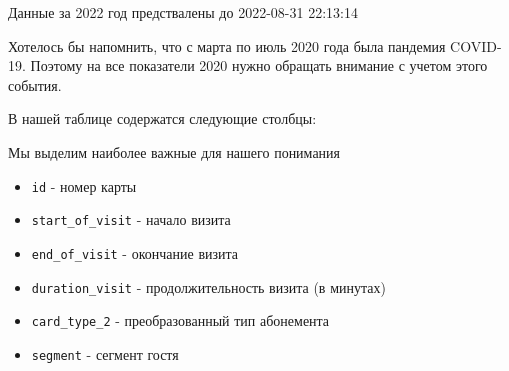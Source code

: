 \documentclass[
  letterpaper,
  DIV=11,
  numbers=noendperiod]{scrreprt}
\begin{document}
\begin{tcolorbox}[enhanced jigsaw, breakable, arc=.35mm, colback=white, left=2mm, colframe=quarto-callout-important-color-frame, toprule=.15mm, bottomrule=.15mm, leftrule=.75mm, opacityback=0, rightrule=.15mm]
\begin{minipage}[t]{5.5mm}
\textcolor{quarto-callout-important-color}{\faExclamation}
\end{minipage}%
\begin{minipage}[t]{\textwidth - 5.5mm}
Данные за 2022 год предствалены до 2022-08-31 22:13:14\end{minipage}%
\end{tcolorbox}

\begin{tcolorbox}[enhanced jigsaw, breakable, arc=.35mm, colback=white, left=2mm, colframe=quarto-callout-warning-color-frame, toprule=.15mm, bottomrule=.15mm, leftrule=.75mm, opacityback=0, rightrule=.15mm]
\begin{minipage}[t]{5.5mm}
\textcolor{quarto-callout-warning-color}{\faExclamationTriangle}
\end{minipage}%
\begin{minipage}[t]{\textwidth - 5.5mm}
Хотелось бы напомнить, что с марта по июль 2020 года была пандемия
COVID-19. Поэтому на все показатели 2020 нужно обращать внимание с
учетом этого события.\end{minipage}%
\end{tcolorbox}

В нашей таблице содержатся следующие столбцы:

\begin{tcolorbox}[enhanced jigsaw, breakable, arc=.35mm, colback=white, left=2mm, colframe=quarto-callout-note-color-frame, toprule=.15mm, bottomrule=.15mm, leftrule=.75mm, opacityback=0, rightrule=.15mm]
\begin{minipage}[t]{5.5mm}
\textcolor{quarto-callout-note-color}{\faInfo}
\end{minipage}%
\begin{minipage}[t]{\textwidth - 5.5mm}
Мы выделим наиболее важные для нашего понимания\end{minipage}%
\end{tcolorbox}

\begin{itemize}
\item
  \texttt{id} - номер карты
\item
  \texttt{start\_of\_visit} - начало визита
\item
  \texttt{end\_of\_visit} - окончание визита
\item
  \texttt{duration\_visit} - продолжительность визита (в минутах)
\item
  \texttt{сard\_type\_2} - преобразованный тип абонемента
\item
  \texttt{segment} - сегмент гостя
\end{itemize}
\end{document}
